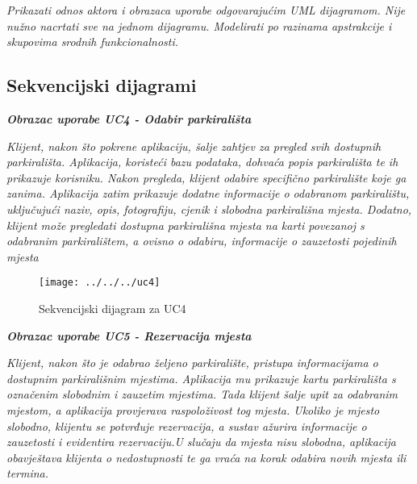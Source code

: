 					\textit{Prikazati odnos aktora i obrazaca uporabe odgovarajućim UML dijagramom. Nije nužno nacrtati sve na jednom dijagramu. Modelirati po razinama apstrakcije i skupovima srodnih funkcionalnosti.}
				\eject		
				
			\subsection{Sekvencijski dijagrami}
				
				 \textbf{\textit{Obrazac uporabe UC4 - Odabir parkirališta}}
				  
				
				 \textit{Klijent, nakon što pokrene aplikaciju, šalje zahtjev za pregled svih dostupnih parkirališta. Aplikacija, koristeći bazu podataka, dohvaća popis parkirališta te ih prikazuje korisniku. Nakon pregleda, klijent odabire specifično parkiralište koje ga zanima. Aplikacija zatim prikazuje dodatne informacije o odabranom parkiralištu, uključujući naziv, opis, fotografiju, cjenik i slobodna parkirališna mjesta. Dodatno, klijent može pregledati dostupna parkirališna mjesta na karti povezanoj s odabranim parkiralištem, a ovisno o odabiru, informacije o zauzetosti pojedinih mjesta}
				    
				       \begin{figure}[hbt!]
				    	   \centering
				    	   \texttt{[image: ../../../uc4]}
				    	   \caption{Sekvencijski dijagram za UC4}
				        	\label{fig:uc4}
				       \end{figure}
				    
				    
				    
				    
				    
				    
				   \textbf{\textit{Obrazac uporabe UC5 - Rezervacija mjesta}}
				   
				   
				  
				   \textit{Klijent, nakon što je odabrao željeno parkiralište, pristupa informacijama o dostupnim parkirališnim mjestima. Aplikacija mu prikazuje kartu parkirališta s označenim slobodnim i zauzetim mjestima. Tada klijent šalje upit za odabranim mjestom, a aplikacija provjerava raspoloživost tog mjesta. Ukoliko je mjesto slobodno, klijentu se potvrđuje rezervacija, a sustav ažurira informacije o zauzetosti i evidentira rezervaciju.U slučaju da mjesta nisu slobodna, aplikacija obavještava klijenta o nedostupnosti te ga vraća na korak odabira novih mjesta ili termina.}
				   
				   \pagebreak
				   
				   
				   
